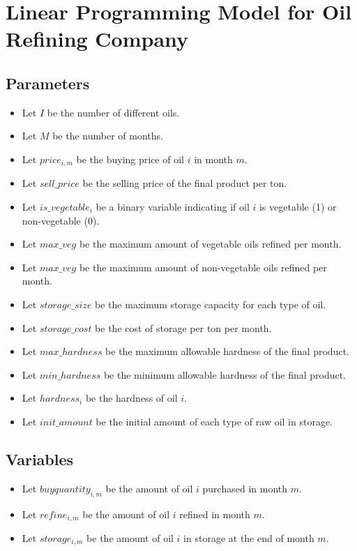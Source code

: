 \documentclass{article}
\begin{document}
\section*{Linear Programming Model for Oil Refining Company}

\subsection*{Parameters}
\begin{itemize}
    \item Let $I$ be the number of different oils.
    \item Let $M$ be the number of months.
    \item Let $price_{i,m}$ be the buying price of oil $i$ in month $m$.
    \item Let $sell\_price$ be the selling price of the final product per ton.
    \item Let $is\_vegetable_i$ be a binary variable indicating if oil $i$ is vegetable (1) or non-vegetable (0).
    \item Let $max\_veg$ be the maximum amount of vegetable oils refined per month.
    \item Let $max\_veg$ be the maximum amount of non-vegetable oils refined per month.
    \item Let $storage\_size$ be the maximum storage capacity for each type of oil.
    \item Let $storage\_cost$ be the cost of storage per ton per month.
    \item Let $max\_hardness$ be the maximum allowable hardness of the final product.
    \item Let $min\_hardness$ be the minimum allowable hardness of the final product.
    \item Let $hardness_i$ be the hardness of oil $i$.
    \item Let $init\_amount$ be the initial amount of each type of raw oil in storage.
\end{itemize}

\subsection*{Variables}
\begin{itemize}
    \item Let $buyquantity_{i,m}$ be the amount of oil $i$ purchased in month $m$.
    \item Let $refine_{i,m}$ be the amount of oil $i$ refined in month $m$.
    \item Let $storage_{i,m}$ be the amount of oil $i$ in storage at the end of month $m$.
\end{itemize}
\end{document}
